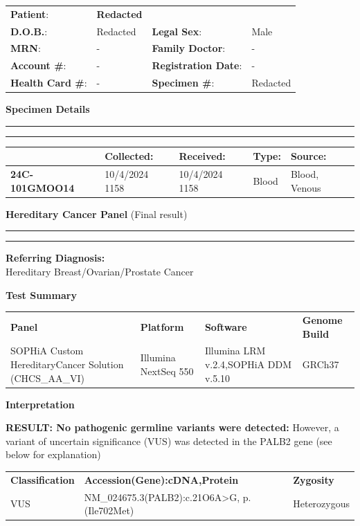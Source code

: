 \documentclass[10pt,letterpaper]{extarticle}
\newcommand{\doublerule}{\rule{\textwidth}{1pt}

\vspace{-2em}%
\rule{\textwidth}{1pt}}
\begin{document}
\colorbox[gray]{0.8}{\parbox{\textwidth}{
  \begin{tabular}{p{} p{} p{} p{}}
    {\bf Patient}: & {\Large \bf Redacted} & & \\
    {\bf D.O.B.}: & Redacted & {\bf Legal Sex}: & Male \\
    {\bf MRN}: & - & {\bf Family Doctor}: & -\\
    {\bf Account \#}: & - & {\bf Registration Date}: & -\\
    {\bf Health Card \#}: & - & {\bf Specimen \#}: & Redacted\\
  \end{tabular}
}}

{\bf Specimen Details}\\
\doublerule

\vspace{-1em}
\begin{tabular}{ p{3.2cm} p{3.2cm} p{3.2cm} p{3.2cm} p{3.2cm} }
              & \bf Collected: & \bf Received: & \bf Type: & \bf Source: \\ \hline
\bf 24C-101GMOO14 &  10/4/2024 1158 & 10/4/2024 1158 & Blood & Blood, Venous \\
\end{tabular}


{\bf Hereditary Cancer Panel} (Final result) \\
\doublerule

{\bf \large Referring Diagnosis:}\\
Hereditary Breast/Ovarian/Prostate Cancer

{\bf \large Test Summary}

\begin{tabular}{ p{} p{} p{} p{} }
\bf Panel & \bf Platform & \bf Software & \bf Genome Build \\
SOPHiA Custom Hereditary\newline Cancer Solution (CHCS\_AA\_VI) & Illumina NextSeq 550 & Illumina LRM v.2.4,\newline SOPHiA DDM v.5.10 & GRCh37\\
\end{tabular}


{\bf \large Interpretation}

{\bf RESULT: No pathogenic germline variants were detected:} However, a variant of uncertain significance (VUS) was detected in the PALB2 gene (see below for explanation)

\begin{tabular}{ l l l }
\bf Classification & \bf Accession(Gene):cDNA,Protein & \bf Zygosity\\
VUS & NM\_024675.3(PALB2):c.21O6A>G, p.(Ile702Met) & Heterozygous\\
\end{tabular}
\end{document}
